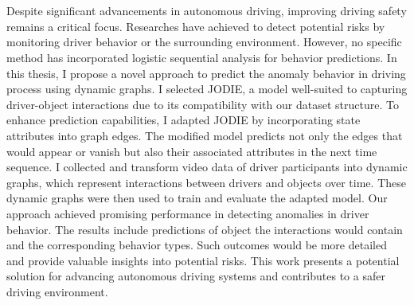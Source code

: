 \chapter{\abstractname}

Despite significant advancements in autonomous driving, improving driving safety remains a critical focus. Researches have achieved to detect potential risks by monitoring  driver behavior or the surrounding environment. However, no specific method has incorporated logistic sequential analysis for behavior predictions. In this thesis, I propose a novel approach to predict the anomaly behavior in driving process using dynamic graphs. I selected JODIE, a model well-suited to capturing driver-object interactions due to its compatibility with our dataset structure. To enhance prediction capabilities, I adapted JODIE by incorporating state attributes into graph edges. The modified model predicts not only the edges that would appear or vanish but also their associated attributes in the next time sequence. I collected and transform video data of driver participants into dynamic graphs, which represent interactions between drivers and objects over time. These dynamic graphs were then used to train and evaluate the adapted model. Our approach achieved promising performance in detecting anomalies in driver behavior. The results include predictions of object the interactions would contain and the corresponding behavior types. Such outcomes would be more detailed and provide valuable insights into potential risks. This work presents a potential solution for advancing autonomous driving systems and contributes to a safer driving environment.



\makeatletter
{}
{\renewcommand{\abstractname}{Kurzfassung}}
{\renewcommand{\abstractname}{Abstract}}
\makeatother

\chapter{\abstractname}

